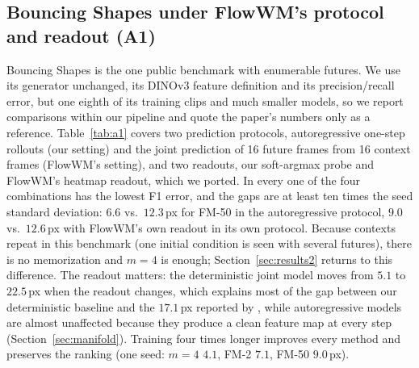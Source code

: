 \subsection{Bouncing Shapes under FlowWM's protocol and readout (A1)}
\label{sec:a1}
Bouncing Shapes \citep{porcher2026flowwm} is the one public benchmark with enumerable futures. We use its generator unchanged, its DINOv3 feature definition and its precision/recall error, but one eighth of its training clips and much smaller models, so we report comparisons within our pipeline and quote the paper's numbers only as a reference. Table~\ref{tab:a1} covers two prediction protocols, autoregressive one-step rollouts (our setting) and the joint prediction of 16 future frames from 16 context frames (FlowWM's setting), and two readouts, our soft-argmax probe and FlowWM's heatmap readout, which we ported. In every one of the four combinations \imlewm{} has the lowest F1 error, and the gaps are at least ten times the seed standard deviation: $6.6$ vs.\ $12.3$\,px for FM-50 in the autoregressive protocol, $9.0$ vs.\ $12.6$\,px with FlowWM's own readout in its own protocol. Because contexts repeat in this benchmark (one initial condition is seen with several futures), there is no memorization and $m{=}4$ is enough; Section~\ref{sec:results2} returns to this difference. The readout matters: the deterministic joint model moves from $5.1$ to $22.5$\,px when the readout changes, which explains most of the gap between our deterministic baseline and the $17.1$\,px reported by \citet{porcher2026flowwm}, while autoregressive models are almost unaffected because they produce a clean feature map at every step (Section~\ref{sec:manifold}). Training four times longer improves every method and preserves the ranking (one seed: \imlewm{} $m{=}4$ $4.1$, FM-2 $7.1$, FM-50 $9.0$\,px).

